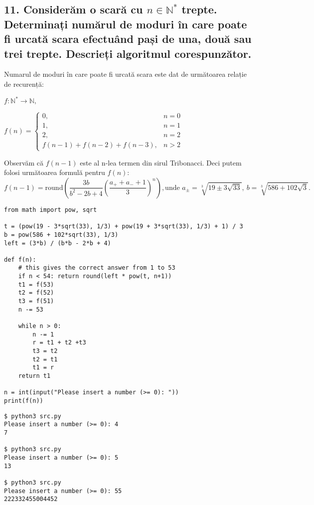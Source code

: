 \documentclass[11pt]{article}
\begin{document}
\begin{itemize}
\subsection*{11. Considerăm o scară cu \(n \in \mathbb{N}^*\) trepte. Determinați numărul de moduri în care poate fi urcată scara efectuând pași de una, două sau trei trepte. Descrieți algoritmul corespunzător.}
\label{sec:org7d13327}


\hspace{\parindent}Numarul de moduri în care poate fi urcată scara este dat de următoarea relație de recurență:

$f : \mathbb{N}^* \to \mathbb{N},$

$
f(n) = 
\begin{cases}
0, & n = 0\\
1, & n = 1\\
2, & n = 2\\
f(n-1)+f(n-2)+f(n-3), & n > 2
\end{cases}
$

Observăm că $f(n-1)$ este al n-lea termen din sirul Tribonacci. Deci putem folosi următoarea formulă pentru $f(n)$:
\[
f(n - 1) = \mathrm{round} \left( 
   \frac{3b} {b^2-2b+4}
   \left(
   \frac{a_++a_-+1}{3}
   \right)^n
  \right),
\text{unde } a_{\pm} = \sqrt[3]{19 \pm 3 \sqrt{33}},\ b = \sqrt[3]{586+102\sqrt{3}}.
\]

\begin{verbatim}
from math import pow, sqrt

t = (pow(19 - 3*sqrt(33), 1/3) + pow(19 + 3*sqrt(33), 1/3) + 1) / 3
b = pow(586 + 102*sqrt(33), 1/3)
left = (3*b) / (b*b - 2*b + 4)

def f(n):
    # this gives the correct answer from 1 to 53
    if n < 54: return round(left * pow(t, n+1))
    t1 = f(53)
    t2 = f(52)
    t3 = f(51)
    n -= 53

    while n > 0:
        n -= 1
        r = t1 + t2 +t3
        t3 = t2
        t2 = t1
        t1 = r
    return t1

n = int(input("Please insert a number (>= 0): "))
print(f(n))
\end{verbatim}

\begin{verbatim}
$ python3 src.py
Please insert a number (>= 0): 4
7

$ python3 src.py
Please insert a number (>= 0): 5
13

$ python3 src.py
Please insert a number (>= 0): 55
222332455004452
\end{verbatim}


\end{itemize}
\end{document}
